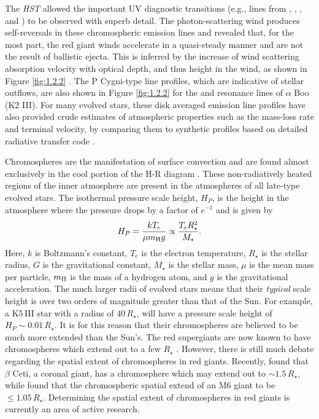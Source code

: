 The \textit{HST} allowed the important UV diagnostic transitions (e.g., lines from , , , and ) to be observed with superb detail. The photon-scattering wind produces self-reversals in these chromospheric emission lines and revealed that, for the most part, the red giant winds accelerate in a quasi-steady manner and are not the result of ballistic ejecta. This is inferred by the increase of wind scattering absorption velocity with optical depth, and thus height in the wind, as shown in Figure \ref{fig:1.2.2} \citep{carpenter_1999}. The P Cygni-type line profiles, which are indicative of stellar outflows, are also shown in Figure \ref{fig:1.2.2} for the  and  resonance lines of $\alpha$ Boo (K2 III). For many evolved stars, these disk averaged emission line profiles have also provided crude estimates of atmospheric properties such as the mass-loss rate and terminal velocity, by comparing them to synthetic profiles based on detailed radiative transfer code \citep[e.g.,][]{robinson_1998}.

Chromospheres are the manifestation of surface convection and are found almost exclusively in the cool portion of the H-R diagram \citep{ayres_2010b}. These non-radiatively  heated regions of the inner atmosphere are present in the atmospheres of all late-type evolved stars. The isothermal pressure scale height, $H_{P}$, is the height in the atmosphere where the pressure drops by a factor of $e^{-1}$ and is given by
\begin{equation}
H_{P}=\frac{kT_e}{\mu m_{\rm{H}} g} \propto \frac{T_{e}R_{\star}^2}{M_{\star}}.
\end{equation}
Here, $k$ is Boltzmann's constant, $T_{e}$ is the electron temperature, $R_{\star}$ is the stellar radius, $G$ is the gravitational constant, $M_{\star}$ is the stellar mass, $\mu$ is the mean mass per particle, $m_{\rm{H}}$ is the mass of a hydrogen atom, and $g$ is the gravitational acceleration. The much larger radii of evolved stars means that their \textit{typical} scale height is over two orders of magnitude greater than that of the Sun. For example, a K5\,III star with a radius of $40\,R_{\star}$, will have a pressure scale height of $H_{P} \sim 0.01\,R_{\star}$. It is for this reason that their chromospheres are believed to be much more extended than the Sun's. The red supergiants are now known to have chromospheres which extend out to a few $R_{\star}$ \citep{lim_1998, harper_2001}. However, there is still much debate regarding the spatial extent of chromospheres in red giants. Recently, \cite{berio_2011} found that $\beta$ Ceti, a coronal giant, has a chromosphere which may extend out to $\sim 1.5\,R_{\star}$, while \cite{luttermoser_1994} found that the chromospheric spatial extend of an M6 giant to be $\le 1.05\,R_{\star}$. Determining the spatial extent of chromospheres in red giants is currently an area of active research.


